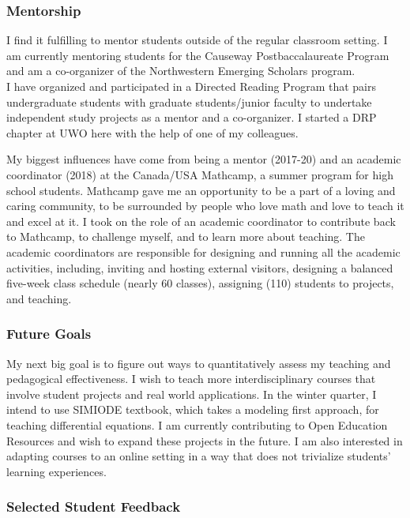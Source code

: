 \documentclass[
]{report}
\begin{document}
\hypertarget{mentorship}{%
\subsubsection*{Mentorship}\label{mentorship}}

I find it fulfilling to mentor students outside of the regular classroom setting.
I am currently mentoring students for the Causeway Postbaccalaureate Program and am a co-organizer of the Northwestern Emerging Scholars program.\\
I have organized and participated in a Directed Reading Program that pairs undergraduate students with graduate students/junior faculty to undertake independent study projects as a mentor and a co-organizer.
I started a DRP chapter at UWO here with the help of one of my colleagues.

My biggest influences have come from being a mentor (2017-20) and an academic coordinator
(2018) at the Canada/USA Mathcamp, a summer program for high school students.
Mathcamp gave me an opportunity to be a part of a loving and caring community, to be surrounded by people who love math and love to teach it and excel at it.
I took on the role of an academic coordinator to contribute back to Mathcamp, to challenge myself, and to learn more about teaching.
The academic coordinators are responsible for designing and running all the academic activities, including, inviting and hosting external visitors, designing a balanced five-week class schedule (nearly 60 classes), assigning (110) students to projects, and teaching.

\hypertarget{future-goals}{%
\subsubsection*{Future Goals}\label{future-goals}}

My next big goal is to figure out ways to quantitatively assess my teaching and pedagogical effectiveness.
I wish to teach more interdisciplinary courses that involve student projects and real world applications.
In the winter quarter, I intend to use SIMIODE textbook, which takes a modeling first approach, for teaching differential equations.
I am currently contributing to Open Education Resources and wish to expand these projects in the future.
I am also interested in adapting courses to an online setting in a way that does not trivialize students' learning experiences.

\hypertarget{selected-student-feedback}{%
\subsubsection*{Selected Student Feedback}\label{selected-student-feedback}}
\end{document}
